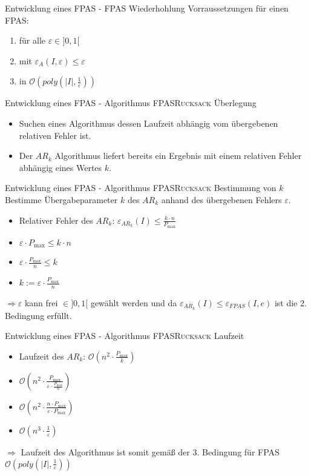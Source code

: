 \begin{frame}{Entwicklung eines FPAS - FPAS Wiederhohlung}
	Vorraussetzungen für einen FPAS:
	\begin{enumerate}
		\item für alle $\varepsilon \in ]0, 1[$ 
		\item mit $\varepsilon_A(I,\varepsilon) \le \varepsilon$
		\item in $\displaystyle \mathcal O(poly(\vert I \vert, \frac{1}{\varepsilon}))$
	\end{enumerate}
\end{frame}

\begin{frame}{Entwicklung eines FPAS - Algorithmus \textsc{FPASRucksack} Überlegung}
	\begin{itemize}
		\item
		Suchen eines Algorithmus dessen Laufzeit abhängig vom übergebenen relativen Fehler ist.
		\item
		Der $AR_k$ Algorithmus liefert bereits ein Ergebnis mit einem relativen Fehler abhängig eines Wertes $k$.
	\end{itemize}
\end{frame}

\begin{frame}{Entwicklung eines FPAS - Algorithmus \textsc{FPASRucksack} Bestimmung von $k$}
	Bestimme Übergabeparameter $k$ des $AR_k$ anhand des übergebenen Fehlers $\varepsilon$.
	\begin{itemize}
		\item
		Relativer Fehler des $AR_k$: $\displaystyle \varepsilon_{AR_k}(I) \le \frac{k \cdot n}{P_{\max}}$
		\pause
		\item[]
		$\displaystyle \varepsilon \cdot P_{\max} \le k \cdot n$
		\item[]
		$\displaystyle \varepsilon \cdot \frac{P_{\max}}{n} \le k$
		\item[]
		$\displaystyle k := \varepsilon \cdot \frac{P_{\max}}{n}$
	\end{itemize}

$\Rightarrow \varepsilon$ kann frei $\in]0,1[$ gewählt werden und da $\varepsilon_{AR_k}(I) \le \varepsilon_{FPAS}(I,e)$  ist die 2. Bedingung erfüllt.

\end{frame}
\begin{frame}{Entwicklung eines FPAS - Algorithmus \textsc{FPASRucksack} Laufzeit}
	\begin{itemize}
		\item
		Laufzeit des $AR_k$: $\displaystyle \mathcal O(n^2 \cdot \frac{P_{\max}}{k})$
		\pause
		\item[]
		$\displaystyle \mathcal O(n^2 \cdot \frac{P_{\max}}{\varepsilon \cdot \frac{P_{\max}}{n}})$
		\item[]
		$\displaystyle \mathcal O(n^2 \cdot \frac{n \cdot P_{\max}}{\varepsilon \cdot P_{\max}})$
		\item[]
		$\displaystyle \mathcal O(n^3 \cdot \frac{1}{\varepsilon})$
	\end{itemize}
$\Rightarrow$ Laufzeit des Algorithmus ist somit gemäß der 3. Bedingung für FPAS $\displaystyle \mathcal O(poly(\vert I \vert, \frac{1}{\varepsilon}))$
\end{frame}